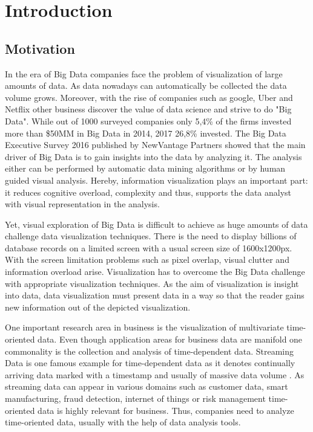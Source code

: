 \chapter{Introduction}
\label{chap:introduction}

\section{Motivation}
In the era of Big Data companies face the problem of visualization of large amounts of data. As data nowadays can automatically be collected the data volume grows. Moreover, with the rise of companies such as google, Uber and Netflix other business discover the value of data science and strive to do "Big Data". While out of 1000 surveyed companies only 5,4\% of the firms invested more than \$50MM in Big Data in 2014, 2017 26,8\% invested. The Big Data Executive Survey 2016 published by NewVantage Partners showed that the main driver of Big Data is to gain insights into the data by analyzing it\cite{Bean2016}. The analysis either can be performed by automatic data mining algorithms or by human guided visual analysis. Hereby, information visualization plays an important part: it reduces cognitive overload, complexity and thus, supports the data analyst with visual representation in the analysis.
\par
 Yet, visual exploration of Big Data is difficult to achieve as huge amounts of data challenge data visualization techniques. There is the need to display billions of database records on a limited screen with a usual screen size of 1600x1200px. With the screen limitation problems such as pixel overlap, visual clutter and information overload arise. Visualization has to overcome the Big Data challenge with appropriate visualization techniques.
As the aim of visualization is insight into data, data visualization must present data in a way so that the reader gains new information out of the depicted visualization.
\par
One important research area in business is the visualization of multivariate time-oriented data. Even though application areas for business data are manifold one commonality is the collection and analysis of time-dependent data. Streaming Data is one famous example for time-dependent data as it denotes continually arriving data marked with a timestamp and usually of massive data volume \cite{o2002streaming} . As streaming data can appear in various domains such as customer data, smart manufacturing, fraud detection, internet of things or risk management time-oriented data is highly relevant for business. Thus, companies need to analyze time-oriented data, usually with the help of data analysis tools. 
